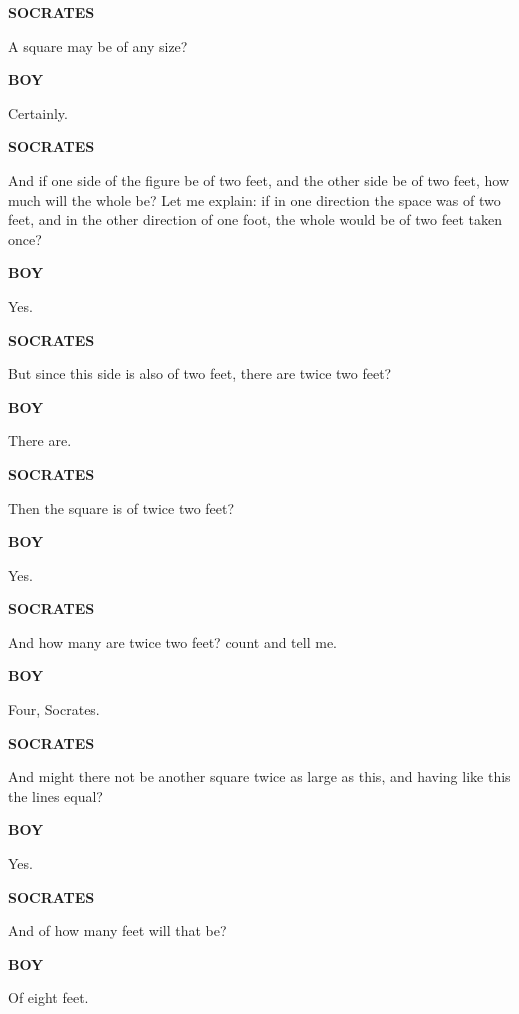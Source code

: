 \documentclass[11pt,letter]{article}
\begin{document}
\par \textbf{SOCRATES}
\par   A square may be of any size?

\par \textbf{BOY}
\par   Certainly.

\par \textbf{SOCRATES}
\par   And if one side of the figure be of two feet, and the other side be of two feet, how much will the whole be? Let me explain:  if in one direction the space was of two feet, and in the other direction of one foot, the whole would be of two feet taken once?

\par \textbf{BOY}
\par   Yes.

\par \textbf{SOCRATES}
\par   But since this side is also of two feet, there are twice two feet?

\par \textbf{BOY}
\par   There are.

\par \textbf{SOCRATES}
\par   Then the square is of twice two feet?

\par \textbf{BOY}
\par   Yes.

\par \textbf{SOCRATES}
\par   And how many are twice two feet? count and tell me.

\par \textbf{BOY}
\par   Four, Socrates.

\par \textbf{SOCRATES}
\par   And might there not be another square twice as large as this, and having like this the lines equal?

\par \textbf{BOY}
\par   Yes.

\par \textbf{SOCRATES}
\par   And of how many feet will that be?

\par \textbf{BOY}
\par   Of eight feet.
\end{document}
